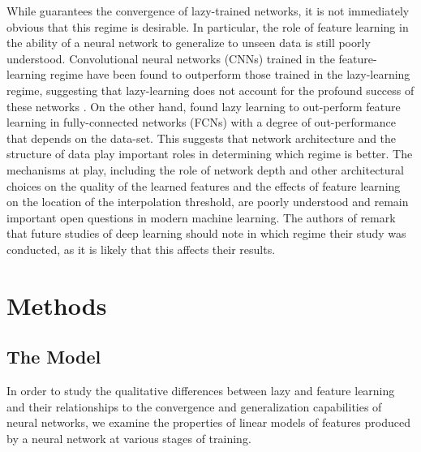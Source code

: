 \documentclass[a4paper, 11pt]{article}
\begin{document}
 While \cite{allen-zhuConvergenceTheoryDeep2019} guarantees the convergence of lazy-trained networks, it is not immediately obvious that this regime is desirable. In particular, the role of feature learning in the ability of a neural network to generalize to unseen data is still poorly understood. Convolutional neural networks (CNNs) trained in the feature-learning regime have been found to outperform those trained in the lazy-learning regime, suggesting that lazy-learning does not account for the profound success of these networks \cite{chizatLazyTrainingDifferentiable2020}. On the other hand, \cite{geigerDisentanglingFeatureLazy2020} found lazy learning to out-perform feature learning in fully-connected networks (FCNs) with a degree of out-performance that depends on the data-set. This suggests that network architecture and the structure of data play important roles in determining which regime is better. The mechanisms at play, including the role of network depth and other architectural choices on the quality of the learned features and the effects of feature learning on the location of the interpolation threshold, are poorly understood and remain important open questions in modern machine learning. The authors of \cite{geigerDisentanglingFeatureLazy2020} remark that future studies of deep learning should note in which regime their study was conducted, as it is likely that this affects their results.

\section{Methods}
\subsection{The Model}

In order to study the qualitative differences between lazy and feature learning and their relationships to the convergence and generalization capabilities of neural networks, we examine the properties of linear models of features produced by a neural network at various stages of training. \\
\end{document}
